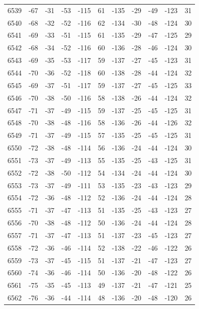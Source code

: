 \begin{table}[H]
\begin{tabular}{lllllllllll}
6539 & -67 & -31 & -53 & -115 & 61 & -135 & -29 & -49 & -123 & 31 \\
6540 & -68 & -32 & -52 & -116 & 62 & -134 & -30 & -48 & -124 & 30 \\
6541 & -69 & -33 & -51 & -115 & 61 & -135 & -29 & -47 & -125 & 29 \\
6542 & -68 & -34 & -52 & -116 & 60 & -136 & -28 & -46 & -124 & 30 \\
6543 & -69 & -35 & -53 & -117 & 59 & -137 & -27 & -45 & -123 & 31 \\
6544 & -70 & -36 & -52 & -118 & 60 & -138 & -28 & -44 & -124 & 32 \\
6545 & -69 & -37 & -51 & -117 & 59 & -137 & -27 & -45 & -125 & 33 \\
6546 & -70 & -38 & -50 & -116 & 58 & -138 & -26 & -44 & -124 & 32 \\
6547 & -71 & -37 & -49 & -115 & 59 & -137 & -25 & -45 & -125 & 31 \\
6548 & -70 & -38 & -48 & -116 & 58 & -136 & -26 & -44 & -126 & 32 \\
6549 & -71 & -37 & -49 & -115 & 57 & -135 & -25 & -45 & -125 & 31 \\
6550 & -72 & -38 & -48 & -114 & 56 & -136 & -24 & -44 & -124 & 30 \\
6551 & -73 & -37 & -49 & -113 & 55 & -135 & -25 & -43 & -125 & 31 \\
6552 & -72 & -38 & -50 & -112 & 54 & -134 & -24 & -44 & -124 & 30 \\
6553 & -73 & -37 & -49 & -111 & 53 & -135 & -23 & -43 & -123 & 29 \\
6554 & -72 & -36 & -48 & -112 & 52 & -136 & -24 & -44 & -124 & 28 \\
6555 & -71 & -37 & -47 & -113 & 51 & -135 & -25 & -43 & -123 & 27 \\
6556 & -70 & -38 & -48 & -112 & 50 & -136 & -24 & -44 & -124 & 28 \\
6557 & -71 & -37 & -47 & -113 & 51 & -137 & -23 & -45 & -123 & 27 \\
6558 & -72 & -36 & -46 & -114 & 52 & -138 & -22 & -46 & -122 & 26 \\
6559 & -73 & -37 & -45 & -115 & 51 & -137 & -21 & -47 & -123 & 27 \\
6560 & -74 & -36 & -46 & -114 & 50 & -136 & -20 & -48 & -122 & 26 \\
6561 & -75 & -35 & -45 & -113 & 49 & -137 & -21 & -47 & -121 & 25 \\
6562 & -76 & -36 & -44 & -114 & 48 & -136 & -20 & -48 & -120 & 26 \\

\end{tabular}
\end{table}
